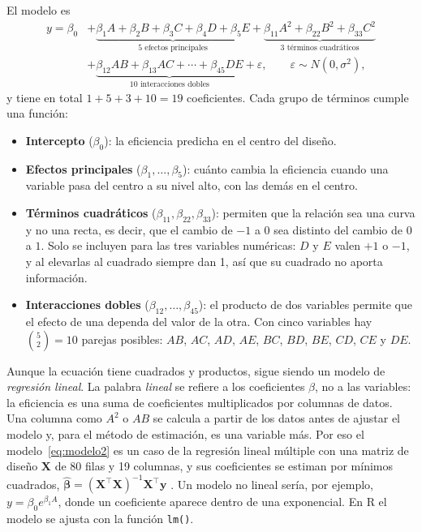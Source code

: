 El modelo es
\begin{align}
y = \beta_0
&+ \underbrace{\beta_1 A + \beta_2 B + \beta_3 C + \beta_4 D + \beta_5 E}_{\text{5 efectos principales}}
 + \underbrace{\beta_{11} A^2 + \beta_{22} B^2 + \beta_{33} C^2}_{\text{3 términos cuadráticos}} \nonumber \\
&+ \underbrace{\beta_{12} AB + \beta_{13} AC + \cdots + \beta_{45} DE}_{\text{10 interacciones dobles}}
 + \varepsilon, \qquad \varepsilon \sim N(0, \sigma^2),
\label{eq:modelo2}
\end{align}
y tiene en total $1 + 5 + 3 + 10 = 19$ coeficientes. Cada grupo de términos cumple una función:
\begin{itemize}
  \item \textbf{Intercepto} ($\beta_0$): la eficiencia predicha en el centro del diseño.
  \item \textbf{Efectos principales} ($\beta_1, \ldots, \beta_5$): cuánto cambia la eficiencia cuando una variable pasa del centro a su nivel alto, con las demás en el centro.
  \item \textbf{Términos cuadráticos} ($\beta_{11}, \beta_{22}, \beta_{33}$): permiten que la relación sea una curva y no una recta, es decir, que el cambio de $-1$ a $0$ sea distinto del cambio de $0$ a $1$. Solo se incluyen para las tres variables numéricas: $D$ y $E$ valen $+1$ o $-1$, y al elevarlas al cuadrado siempre dan 1, así que su cuadrado no aporta información.
  \item \textbf{Interacciones dobles} ($\beta_{12}, \ldots, \beta_{45}$): el producto de dos variables permite que el efecto de una dependa del valor de la otra. Con cinco variables hay $\binom{5}{2} = 10$ parejas posibles: $AB$, $AC$, $AD$, $AE$, $BC$, $BD$, $BE$, $CD$, $CE$ y $DE$.
\end{itemize}

Aunque la ecuación tiene cuadrados y productos, sigue siendo un modelo de \emph{regresión lineal}. La palabra \emph{lineal} se refiere a los coeficientes $\beta$, no a las variables: la eficiencia es una suma de coeficientes multiplicados por columnas de datos. Una columna como $A^2$ o $AB$ se calcula a partir de los datos antes de ajustar el modelo y, para el método de estimación, es una variable más. Por eso el modelo~\eqref{eq:modelo2} es un caso de la regresión lineal múltiple con una matriz de diseño $\mathbf{X}$ de 80 filas y 19 columnas, y sus coeficientes se estiman por mínimos cuadrados, $\hat{\bm{\beta}} = (\mathbf{X}^\top\mathbf{X})^{-1}\mathbf{X}^\top\mathbf{y}$ \citep{Montgomery2005}. Un modelo no lineal sería, por ejemplo, $y = \beta_0 e^{\beta_1 A}$, donde un coeficiente aparece dentro de una exponencial. En R el modelo se ajusta con la función \texttt{lm()}.

